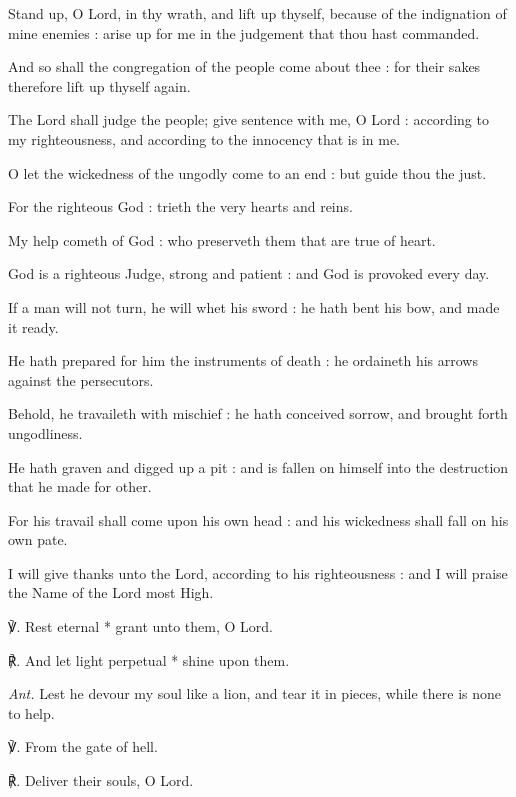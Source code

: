 Stand up, O Lord, in thy wrath, and lift up thyself, because of the indignation of mine enemies : arise up for me in the judgement that thou hast commanded.\par
{}And so shall the congregation of the people come about thee : for their sakes therefore lift up thyself again.\par
{}The Lord shall judge the people; give sentence with me, O Lord : according to my righteousness, and according to the innocency that is in me.\par
{}O let the wickedness of the ungodly come to an end : but guide thou the just.\par
{}For the righteous God : trieth the very hearts and reins.\par
{}My help cometh of God : who preserveth them that are true of heart.\par
{}God is a righteous Judge, strong and patient : and God is provoked every day.\par
{}If a man will not turn, he will whet his sword : he hath bent his bow, and made it ready.\par
{}He hath prepared for him the instruments of death : he ordaineth his arrows against the persecutors.\par
{}Behold, he travaileth with mischief : he hath conceived sorrow, and brought forth ungodliness.\par
{}He hath graven and digged up a pit : and is fallen on himself into the destruction that he made for other.\par
{}For his travail shall come upon his own head : and his wickedness shall fall on his own pate.\par
{}I will give thanks unto the Lord, according to his righteousness : and I will praise the Name of the Lord most High.\par
℣. Rest eternal * grant unto them, O Lord.\par
℟. And let light perpetual * shine upon them.\par\noindent
\textit{Ant.} Lest he devour my soul like a lion, and tear it in pieces, while there is none to help.\par
\vspace{0.5\baselineskip}
℣. From the gate of hell.\par
℟. Deliver their souls, O Lord.\par
